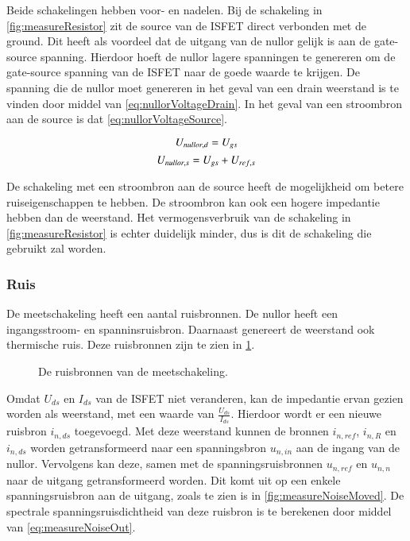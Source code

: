 Beide schakelingen hebben voor- en nadelen.
Bij de schakeling in \cref{fig:measureResistor} zit de source van de ISFET direct verbonden met de ground. Dit heeft als voordeel dat de uitgang van de nullor gelijk is aan de gate-source spanning. Hierdoor hoeft de nullor lagere spanningen te genereren om de gate-source spanning van de ISFET naar de goede waarde te krijgen. De spanning die de nullor moet genereren in het geval van een drain weerstand is te vinden door middel van \cref{eq:nullorVoltageDrain}. In het geval van een stroombron aan de source is dat \cref{eq:nullorVoltageSource}.

\begin{equation}\label{eq:nullorVoltageDrain}
    U_{nullor,d} = U_{gs}
    \tagaddtext{[\si{\volt}]}
\end{equation}
\begin{equation}\label{eq:nullorVoltageSource}
    U_{nullor,s} = U_{gs} + U_{ref,s}
    \tagaddtext{[\si{\volt}]}
\end{equation}

De schakeling met een stroombron aan de source heeft de mogelijkheid om betere ruiseigenschappen te hebben. De stroombron kan ook een hogere impedantie hebben dan de weerstand. Het vermogensverbruik van de schakeling in \cref{fig:measureResistor} is echter duidelijk minder, dus is dit de schakeling die gebruikt zal worden.

\subsubsection{Ruis}

De meetschakeling heeft een aantal ruisbronnen. De nullor heeft een ingangsstroom- en spanninsruisbron. Daarnaast genereert de weerstand ook thermische ruis. Deze ruisbronnen zijn te zien in \cref{fig:measureNoise}.
\begin{figure}[!htbp]
    \centering
    \def\svgwidth{0.6\textwidth}
    
    \caption{De ruisbronnen van de meetschakeling.}
    \label{fig:measureNoise}
\end{figure}


Omdat $U_{ds}$ en $I_{ds}$ van de ISFET niet veranderen, kan de impedantie ervan gezien worden als weerstand, met een waarde van $\frac{U_{ds}}{I_{ds}}$. Hierdoor wordt er een nieuwe ruisbron $i_{n,ds}$ toegevoegd. Met deze weerstand kunnen de bronnen $i_{n,ref}$, $i_{n,R}$ en $i_{n,ds}$ worden getransformeerd naar een spanningsbron $u_{n,in}$ aan de ingang van de nullor.
Vervolgens kan deze, samen met de spanningsruisbronnen $u_{n,ref}$ en $u_{n,n}$ naar de uitgang getransformeerd worden. Dit komt uit op een enkele spanningsruisbron aan de uitgang, zoals te zien is in \cref{fig:measureNoiseMoved}. De spectrale spanningsruisdichtheid van deze ruisbron is te berekenen door middel van \cref{eq:measureNoiseOut}.

